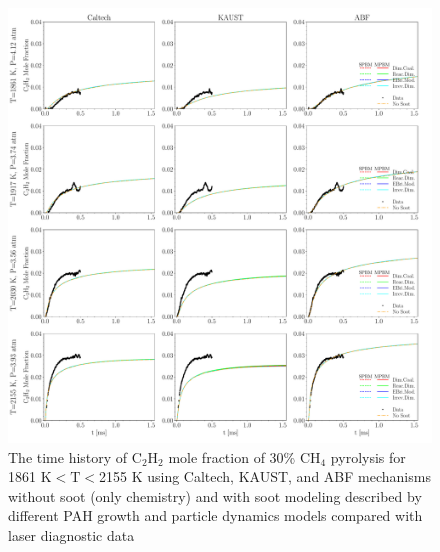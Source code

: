\begin{figure}[H]
	\centering
	\includegraphics[width=1\textwidth]{Figures/Results/Shocktube/Stanford/june/30CH4_C2H2_mechs_s0.pdf}
	\caption{The time history of $\mathrm{C_2H_2}$ mole fraction of 30\% $\mathrm{CH_4}$ pyrolysis for 1861 K$<\mathrm{T}<$2155 K using Caltech, KAUST, and ABF mechanisms without soot (only chemistry) and with soot modeling described by different PAH growth and particle dynamics models compared with laser diagnostic data}
	\label{fig:shocktubest_30ch4_c2h2_0} 
\end{figure}


